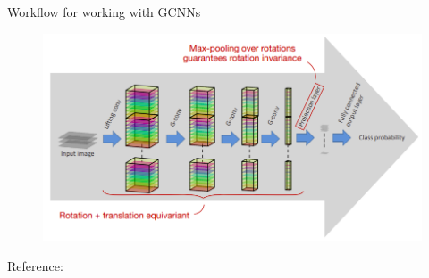 \documentclass[9pt,dvipsnames]{beamer}
\begin{document}
\begin{frame}{Workflow for working with GCNNs}

	\begin{figure}[H]
		\centering
		\includegraphics[width=\textwidth]{images/g-cnn_workflow.png}
		\label{fig:g-ccn_workflow}
	\end{figure}
	Reference: \cite{bekkers_uvagedl}

\end{frame}
\end{document}
